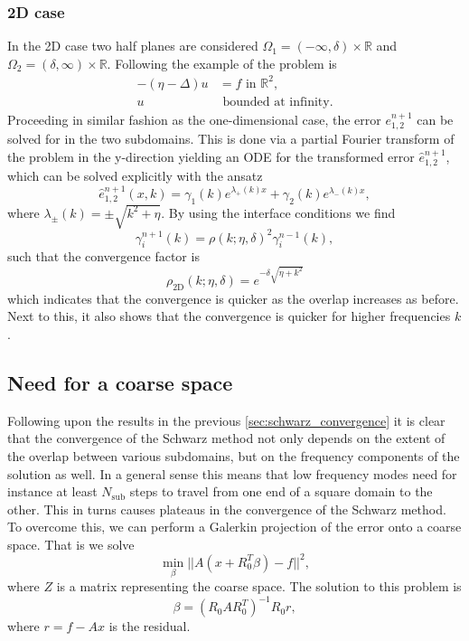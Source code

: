 \subsubsection{2D case}
In the 2D case two half planes are considered $\Omega_1 = (-\infty, \delta)\times \mathbb{R}$ and $\Omega_2 = (\delta, \infty)\times \mathbb{R}$. Following the example of \citeauthor{schwarz_methods_Dolean_2015} the problem is
\begin{align*}
    -(\eta - \Delta) u & = f \text{ in } \mathbb{R}^2, \\
    u                  & \text{ bounded at infinity}.
\end{align*}
Proceeding in similar fashion as the one-dimensional case, the error $e^{n+1}_{1,2}$ can be solved for in the two subdomains. This is done via a partial Fourier transform of the problem in the y-direction yielding an ODE for the transformed error $\hat{e}^{n+1}_{1,2}$, which can be solved explicitly with the ansatz
\[
    \hat{e}^{n+1}_{1,2}(x, k) = \gamma_1(k) e^{\lambda_{+}(k) x} + \gamma_2(k) e^{\lambda_{-}(k) x},
\]
where $\lambda_{\pm}(k) = \pm \sqrt{k^2 + \eta}$. By using the interface conditions we find
\[
    \gamma_{i}^{n+1}(k) = \rho(k;\eta,\delta)^2 \gamma_{i}^{n-1}(k),
\]
such that the convergence factor is \cite[Equation 1.36]{schwarz_methods_Dolean_2015}
\begin{equation}
    \rho_{\text{2D}}(k;\eta,\delta) = e^{-\delta\sqrt{\eta + k^2}}
    \label{eq:2D_Schwarz_convergence}
\end{equation}
which indicates that the convergence is quicker as the overlap increases as before. Next to this, it also shows that the convergence is quicker for higher frequencies $k$.

\subsection{Need for a coarse space}
Following upon the results in the previous \cref{sec:schwarz_convergence} it is clear that the convergence of the Schwarz method not only depends on the extent of the overlap between various subdomains, but on the frequency components of the solution as well. In a general sense this means that low frequency modes need for instance at least $N_{\text{sub}}$ steps to travel from one end of a square domain to the other. This in turns causes plateaus in the convergence of the Schwarz method. To overcome this, we can perform a Galerkin projection of the error onto a coarse space. That is we solve
\[
    \min_{\beta} ||A(x + R_0^T\beta) - f||^2,
\]
where $Z$ is a matrix representing the coarse space. The solution to this problem is
\[
    \beta = (R_0 A R_0^T)^{-1} R_0 r,
\]
where $r = f - A x$ is the residual.

